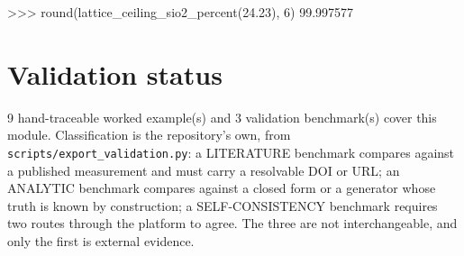 \documentclass[10pt,a4paper,twoside]{report}
\begin{document}
\begin{doctestblock}
>>> round(lattice_ceiling_sio2_percent(24.23), 6)
99.997577
\end{doctestblock}

\section{Validation status}

9 hand-traceable worked example(s) and 3 validation benchmark(s) cover this module. Classification is the repository's own, from \texttt{scripts/export\_validation.py}: a LITERATURE benchmark compares against a published measurement and must carry a resolvable DOI or URL; an ANALYTIC benchmark compares against a closed form or a generator whose truth is known by construction; a SELF-CONSISTENCY benchmark requires two routes through the platform to agree. The three are not interchangeable, and only the first is external evidence.

\footnotesize
\end{document}
